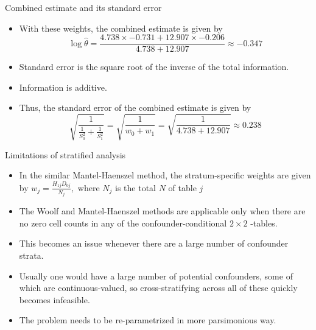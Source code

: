 \documentclass[10pt]{beamer}\usepackage[]{graphicx}\usepackage[]{color}
\begin{document}
\begin{frame}{Combined estimate and its standard error}
	\begin{itemize}
		\item With these weights, the combined estimate is given by
		$$
		\log \hat{\theta}=\frac{4.738 \times-0.731+12.907 \times-0.206}{4.738+12.907} \approx-0.347
		$$
		\item Standard error is the square root of the inverse of the total information.
		\item  Information is additive.
		\item  Thus, the standard error of the combined estimate is given by
		$$
		\sqrt{\frac{1}{\frac{1}{S_{0}^{2}}+\frac{1}{S_{1}^{2}}}}=\sqrt{\frac{1}{w_{0}+w_{1}}}=\sqrt{\frac{1}{4.738+12.907}} \approx 0.238
		$$
	\end{itemize}
\end{frame}



\begin{frame}{Limitations of stratified analysis}
	\begin{itemize}
		\item In the similar Mantel-Haenszel method, the stratum-specific weights are given by $w_{j}=\frac{H_{1 j} D_{0 j}}{N_{j}},$ where $N_{j}$ is the total $N$ of table $j$
		\item  The Woolf and Mantel-Haenszel methods are applicable only when there are no zero cell counts in any of the confounder-conditional $2 \times 2$ -tables.
		\item  This becomes an issue whenever there are a large number of confounder strata.
		\item  Usually one would have a large number of potential confounders, some of which are continuous-valued, so cross-stratifying across all of these quickly becomes infeasible.
		\item  The problem needs to be re-parametrized in more parsimonious way.
	\end{itemize}
\end{frame}
\end{document}
